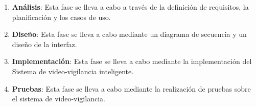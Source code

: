 \begin{enumerate}
    \item \textbf{Análisis}: Esta fase se lleva a cabo a través de la definición de requisitos, la planificación y los casos de uso.
    \item \textbf{Diseño}: Esta fase se lleva a cabo mediante un diagrama de secuencia y un diseño de la interfaz.
    \item \textbf{Implementación}: Esta fase se lleva a cabo mediante la implementación del Sistema de video-vigilancia inteligente.
    \item \textbf{Pruebas}: Esta fase se lleva a cabo mediante la realización de pruebas sobre el sistema de video-vigilancia.
\end{enumerate}
